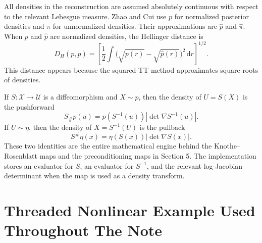 \documentclass[11pt]{article}
\newcommand{\dd}{\,\mathrm d}
\begin{document}
All densities in the reconstruction are assumed absolutely continuous with
respect to the relevant Lebesgue measure.  Zhao and Cui \cite{zhao2024ttsequential} use \(p\) for normalized
posterior densities and \(\pi\) for unnormalized densities.  Their
approximations are \(\widehat p\) and \(\widehat\pi\).  When \(p\) and
\(\widehat p\) are normalized densities, the Hellinger distance is
\[
    D_H(p,\widehat p)
    =
    \left[
    \frac12
    \int
    \bigl(\sqrt{p(r)}-\sqrt{\widehat p(r)}\bigr)^2\dd r
    \right]^{1/2}.
    \label{eq:p24-n3}
\]
This distance appears because the squared-TT method approximates square roots
of densities.

If \(S:\mathcal X\to\mathcal U\) is a diffeomorphism and \(X\sim p\), then
the density of \(U=S(X)\) is the pushforward
\[
    S_\#p(u)
    =
    p(S^{-1}(u))\left|\det\nabla S^{-1}(u)\right|.
    \label{eq:p24-n4}
\]
If \(U\sim\eta\), then the density of \(X=S^{-1}(U)\) is the pullback
\[
    S^\#\eta(x)
    =
    \eta(S(x))\left|\det\nabla S(x)\right|.
    \label{eq:p24-n5}
\]
These two identities are the entire mathematical engine behind the
Knothe--Rosenblatt maps and the preconditioning maps in Section 5.  The
implementation stores an evaluator for \(S\), an evaluator for \(S^{-1}\), and
the relevant log-Jacobian determinant when the map is used as a density
transform.

\section{Threaded Nonlinear Example Used Throughout The Note}
\end{document}
